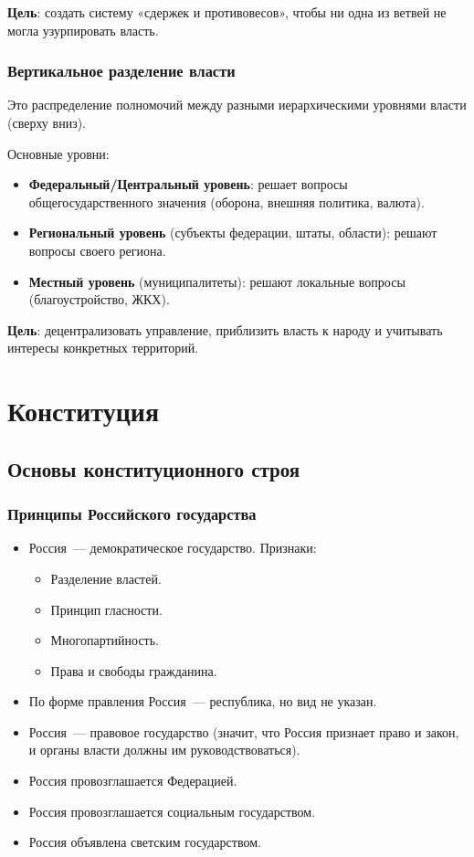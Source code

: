 \documentclass[12pt]{article}
\begin{document}
	\textbf{Цель}: создать систему «сдержек и противовесов», чтобы ни одна из ветвей не могла узурпировать власть.
	
	\subsubsection{Вертикальное разделение власти}
	
	Это распределение полномочий между разными иерархическими уровнями власти (сверху вниз).
	
	Основные уровни:
	\begin{itemize}
		\item \textbf{Федеральный/Центральный уровень}: решает вопросы общегосударственного значения (оборона, внешняя политика, валюта).
		\item \textbf{Региональный уровень} (субъекты федерации, штаты, области): решают вопросы своего региона.
		\item \textbf{Местный уровень} (муниципалитеты): решают локальные вопросы (благоустройство, ЖКХ).
	\end{itemize}
	
	\textbf{Цель}: децентрализовать управление, приблизить власть к народу и учитывать интересы конкретных территорий.
	
	\section{Конституция}
	
	\subsection{Основы конституционного строя}
	
	\subsubsection{Принципы Российского государства}
	
	\begin{itemize}
		\item Россия~--- демократическое государство.
		Признаки:
		\begin{itemize}
			\item Разделение властей.
			\item Принцип гласности.
			\item Многопартийность.
			\item Права и свободы гражданина.
		\end{itemize}
		\item По форме правления Россия~--- республика, но вид не указан.
		\item Россия~--- правовое государство (значит, что Россия признает право и закон, и органы власти должны им руководствоваться).
		\item Россия провозглашается Федерацией.
		\item Россия провозглашается социальным государством.
		\item Россия объявлена светским государством.
	\end{itemize}
	
\end{document}
